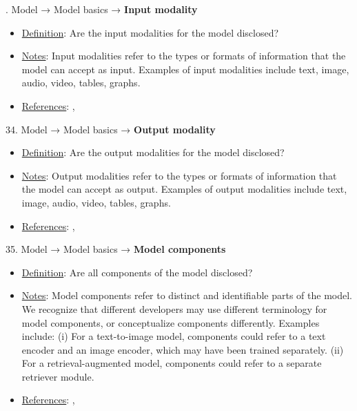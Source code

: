 . Model → Model basics → \textbf{Input modality}
\vspace{-\parskip}
\begin{itemize}
\item
\underline{Definition}: Are the input modalities for the model disclosed?
\item
\underline{Notes}: Input modalities refer to the types or formats of information that the model can accept as input. Examples of input modalities include text, image, audio, video, tables, graphs.
\item
\underline{References}: \citet{mitchell2019model}, \citet{crisan2022interactive}
\end{itemize} \vspace{\baselineskip}


34. Model → Model basics → \textbf{Output modality}
\vspace{-\parskip}
\begin{itemize}
\item
\underline{Definition}: Are the output modalities for the model disclosed?
\item
\underline{Notes}: Output modalities refer to the types or formats of information that the model can accept as output. Examples of output modalities include text, image, audio, video, tables, graphs.
\item
\underline{References}: \citet{mitchell2019model}, \citet{crisan2022interactive}
\end{itemize} \vspace{\baselineskip}


35. Model → Model basics → \textbf{Model components}
\vspace{-\parskip}
\begin{itemize}
\item
\underline{Definition}: Are all components of the model disclosed?
\item
\underline{Notes}: Model components refer to distinct and identifiable parts of the model. We recognize that different developers may use different terminology for model components, or conceptualize components differently. Examples include: (i) For a text-to-image model, components could refer to a text encoder and an image encoder, which may have been trained separately. (ii) For a retrieval-augmented model, components could refer to a separate retriever module.
\item
\underline{References}: \citet{mitchell2019model}, \citet{crisan2022interactive}
\end{itemize} \vspace{\baselineskip}


